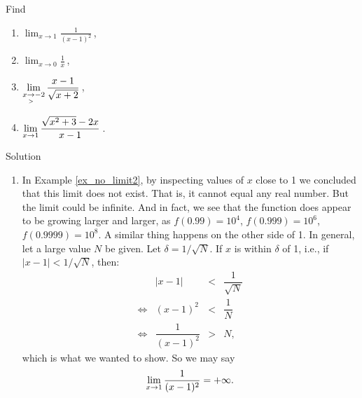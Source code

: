 \begin{example}
Find 
\begin{multicols}{2}
\begin{enumerate}
\item $\displaystyle \lim_{x\rightarrow 1}\frac1{(x-1)^2}$\,,
\item $\displaystyle\lim_{x\rightarrow 0}\frac1x$\,,
\item $\displaystyle\lim_{x\underset{>}{\rightarrow}-2}\dfrac{x-1}{\sqrt{x+2}}$\,,
\item $\displaystyle\lim_{x\rightarrow 1}\dfrac{\sqrt{x^2+3}-2x}{x-1}$\,.
\end{enumerate}
\end{multicols}

Solution 

\begin{enumerate}
\item In Example \ref{ex_no_limit2}, by inspecting values of $x$ close to 1 we concluded that this limit does not exist.  That is, it cannot equal any real number.  But the limit could be infinite.  And in fact, we see that the function does appear to be growing larger and larger, as $f(0.99)=10^4$, $f(0.999)=10^6$, $f(0.9999)=10^8$.  A similar thing happens on the other side of 1.  In general, let a large value $N$ be given. Let $\delta=1/\sqrt{N}$. If $x$ is within $\delta$ of 1, i.e., if $|x-1|<1/\sqrt{N}$, then:
$$
\begin{array}{rrcl}
	&|x-1| &<& \dfrac{1}{\sqrt{N}} \\
	\Leftrightarrow&(x-1)^2 &<& \dfrac{1}{N}\\
	\Leftrightarrow&\dfrac{1}{(x-1)^2} &>& N,
	\end{array}
$$
	which is what we wanted to show.  So we may say 
	$$\displaystyle\lim_{x\rightarrow 1}\dfrac{1}{(x-1)^2}=+\infty.$$
	

\end{enumerate}
\end{example}
